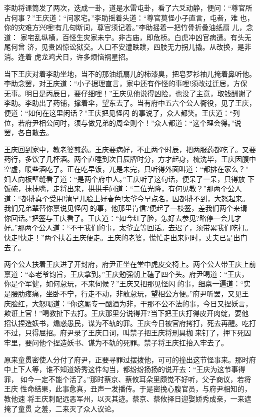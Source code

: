 李助将课筒发了两次，迭成一卦，道是水雷屯卦，看了六爻动静，便问：“尊官所
占何事？”王庆道：“问家宅。”李助摇着头道：“尊官莫怪小子直言，屯者，难
也，你的灾难方兴哩!有几句断词，尊官须记着。”李助摇着一把竹骨折叠油纸扇
儿，念道：
家宅乱纵横，百怪生灾家未宁。非古庙，即危桥。白虎冲凶官病遭。有头无尾何曾
济，见贵凶惊讼狱交。人口不安遭跌蹼，四肢无力拐儿撬。从改换，是非消。逢着
虎龙鸡犬日，许多烦恼祸星招。

当下王庆对着李助坐地，当不的那油纸扇儿的柿漆臭，把皂罗衫袖儿掩着鼻听他。
李助念罢，对王庆道：“小子据理直言，家中还有作怪的事哩!须改过迁居，方保
无事。明日是丙辰日，要仔细哩！”王庆见他说得凶险，也没了主意，取钱酬谢了
李助。李助出了药铺，撑着伞，望东去了。当有府中五六个公人衙役，见了王庆，
便道：“如何在这里闲话？”王庆把见怪闪的事说了，众人都笑。王庆道：“列
位，若府尹相公问时，须与做兄弟的周全则个！”众人都道：“这个理会得。”说
罢，各自散去。

王庆回到家中，教老婆煎药。王庆要病好，不止两个时辰，把两服药都吃了。又要
药行，多饮了几杯酒。两个直睡到次日辰牌时分，方才起身，梳洗毕，王庆因腹中
空虚，暖些酒吃了。正在吃早饭，兀是未完，只听得外面叫道：“都排在家么？”
妇人向板壁缝看了道：“是两个府中人。”王庆听了这句话，便呆了一呆，只得放
下饭碗，抹抹嘴，走将出来，拱拱手问道：“二位光降，有何见教？”那两个公人
道：“都排真个受用!清早儿脸上好春色!太爷今早点名，因都排不到，大怒起来。
我们兄弟辈替你禀说见怪闪的事，他那里肯信?便起了一枝签，差我们两个来请
你回话。”把签与王庆看了。王庆道：“如今红了脸，怎好去参见?略停一会儿才
好。”那两个公人道：“不干我们的事，太爷立等回话。去迟了，须带累我们吃打。
快走!快走！”两个扶着王庆便走。王庆的老婆，慌忙走出来问时，丈夫已是出门
去了。

两个公人扶着王庆进了开封府，府尹正坐在堂中虎皮交椅上。两个公人带王庆上前
禀道：“奉老爷钧旨，王庆拿到。”王庆勉强朝上磕了四个头。府尹喝道：“王庆，
你是个军健，如何怠玩，不来伺候？”王庆又把那见怪闪的事，细禀一遍道：“实
是腰肋疼痛，坐卧不宁，行走不动，非敢怠玩，望相公方便。”府尹听罢，又见王
庆脸红，大怒喝道：“你这厮专一酗酒为非，干那不公不法的事，今日又捏妖言，
欺诳上官！”喝教扯下去打。王庆那里分说得开?当下把王庆打得皮开肉绽，要他
招认捏造妖书，煽惑愚民，谋为不轨的罪。王庆今日被官府拷打，死去再醒。吃打
不过，只得屈招。府尹录了王庆口词，叫禁子把王庆将刑具枷来钉了，押下死囚
牢里，要问他个捏造妖书、谋为不轨的死罪。禁子将王庆扛抬入牢去了。

原来童贯密使人分付了府尹，正要寻罪过摆拨他，可可的撞出这节怪事来。那时府
中上下人等，谁不知道娇秀这件勾当，都纷纷扬扬的说开去：“王庆为这节事得罪，
如今一定不能个活了。”那时蔡京、蔡攸耳朵里颇觉不好听，父子商议，若将王庆
性命结果，此事愈真，丑声一发播传。于是密挽心腹官员，与府尹相知的，教他速
将王庆刺配远恶军州，以灭其迹。蔡京、蔡攸择日迎娶娇秀成亲，一来遮掩了童贯
之羞，二来灭了众人议论。

